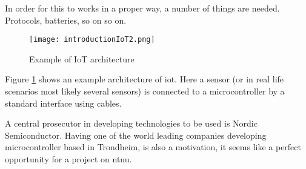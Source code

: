 \noindent In order for this to works in a proper way, a number of things are needed. Protocols, batteries, so on so on. 


\begin{figure}[ht]
    \centering
    \texttt{[image: introductionIoT2.png]}    
    \caption{Example of IoT architecture}
    \label{iotExampleArchitecture}
\end{figure}

\noindent Figure \ref{iotExampleArchitecture} shows an example architecture of \gls{iot}. Here a sensor (or in real life scenarios most likely several sensors) is connected to a \gls{microcontroller} by a standard interface using cables. 




\noindent A central prosecutor in developing technologies to be used is Nordic Semiconductor. Having one of the world leading companies developing \gls{microcontroller} based in Trondheim, is also a motivation, it seems like a perfect opportunity for a project on \gls{ntnu}. 






\newpage


